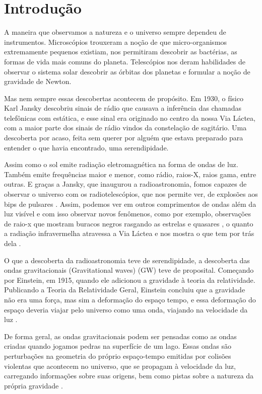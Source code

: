 \chapter{Introdução}
A maneira que observamos a natureza e o universo sempre dependeu de instrumentos. Microscópios trouxeram a noção de que micro-organismos extremamente pequenos existiam, nos permitiram descobrir as bactérias, as formas de vida mais comuns do planeta. Telescópios nos deram habilidades de observar o sistema solar descobrir as órbitas dos planetas e formular a noção de gravidade de Newton. %

Mas nem sempre essas descobertas acontecem de propósito. Em 1930, o físico Karl Jansky descobriu sinais de rádio que causava a inferência das chamadas telefônicas com estática, e esse sinal era originado no centro da nossa Via Láctea, com a maior parte dos sinais de rádio vindos da constelação de sagitário. Uma descoberta por acaso, feita sem querer por alguém que estava preparado para entender o que havia encontrado, uma serendipidade.

Assim como o sol emite radiação eletromagnética na forma de ondas de luz. Também emite frequências maior e menor, como rádio, raios-X, raios gama, entre outras. E graças a Jansky, que inaugurou a radioastronomia, fomos capazes de observar o universo com os radiotelescópios, que nos permite ver, de explosões aos bips de pulsares \cite{jansky1932directional}. Assim, podemos ver em outros comprimentos de ondas além da luz visível e com isso observar novos fenômenos, como por exemplo, observações de raio-x que mostram buracos negros rasgando as estrelas \cite{200814} e quasares \cite{mortlock2011luminous}, o quanto a radiação infravermelha atravessa a Via Láctea e nos mostra o que tem por trás dela \cite{wright2010wide}. 

O que a descoberta da radioastronomia teve de serendipidade, a descoberta das ondas gravitacionais (Gravitational waves) (GW) teve de proposital. Começando por Einstein, em 1915, quando ele adicionou a gravidade à teoria da relatividade. Publicando a Teoria da Relatividade Geral, Einstein concluiu que a gravidade não era uma força, mas sim a deformação do espaço tempo, e essa deformação do espaço deveria viajar pelo universo como uma onda, viajando na velocidade da luz \cite{albert1920realtivity}.

De forma geral, as ondas gravitacionais podem ser pensadas como as ondas criadas quando jogamos pedras na superfície de um lago. Essas ondas são perturbações na geometria do próprio espaço-tempo emitidas por colisões violentas que acontecem no universo, que se propagam à velocidade da luz, carregando informações sobre suas origens, bem como pistas sobre a natureza da própria gravidade \cite{LSC-VIRGO, abbott2016observation}.

